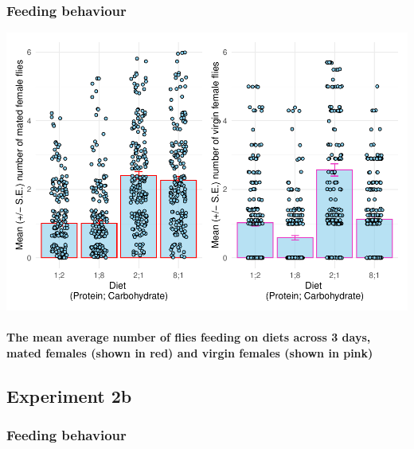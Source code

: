 \documentclass[
]{article}
\begin{document}
\hypertarget{feeding-behaviour-1}{%
\subsubsection{Feeding behaviour}\label{feeding-behaviour-1}}

\includegraphics{Drosophila-project_files/figure-latex/unnamed-chunk-6-1.pdf}

\hypertarget{the-mean-average-number-of-flies-feeding-on-diets-across-3-days-mated-females-shown-in-red-and-virgin-females-shown-in-pink}{%
\paragraph{The mean average number of flies feeding on diets across 3
days, mated females (shown in red) and virgin females (shown in
pink)}\label{the-mean-average-number-of-flies-feeding-on-diets-across-3-days-mated-females-shown-in-red-and-virgin-females-shown-in-pink}}

\hypertarget{experiment-2b}{%
\subsection{Experiment 2b}\label{experiment-2b}}

\hypertarget{feeding-behaviour-2}{%
\subsubsection{Feeding behaviour}\label{feeding-behaviour-2}}
\end{document}
